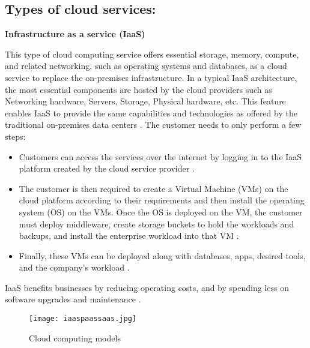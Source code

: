 \subsection{Types of cloud services:}
\textbf{Infrastructure as a service (IaaS)}
\par This type of cloud computing service offers
essential storage, memory, compute, and related networking, such as
operating systems and databases, as a cloud service to replace the on-premises infrastructure.
In a typical IaaS
architecture, the most essential components are hosted by the cloud providers such as Networking hardware, Servers, Storage, Physical hardware, etc. This feature enables IaaS to provide the same capabilities and technologies as offered by the traditional on-premises data centers \cite{9}. The customer needs to only perform a few steps:
\begin{itemize}
    \item Customers can access the services over the internet by logging in to the IaaS platform created by the cloud
    service provider \cite{15}.
\end{itemize}
\begin{itemize}
    \item The customer is then required to create a Virtual
    Machine (VMs) on the cloud platform according to their
    requirements and then install the operating system
    (OS) on the VMs. Once the OS is deployed on the VM,
    the customer must deploy middleware, create
    storage buckets to hold the workloads and backups, and
    install the enterprise workload into that VM \cite{15}.
\end{itemize}
\begin{itemize}
    \item Finally, these VMs can be deployed along with databases, apps, desired tools, and the company’s workload \cite{15}.
\end{itemize}
IaaS benefits businesses by reducing operating costs, and by spending less on software upgrades and maintenance
\cite{15}.

\begin{figure}
    \centering
    \texttt{[image: iaaspaassaas.jpg]}
    \caption{Cloud computing models}{\cite{99}}
    \label{fig:iaaspaassaas}
\end{figure}

